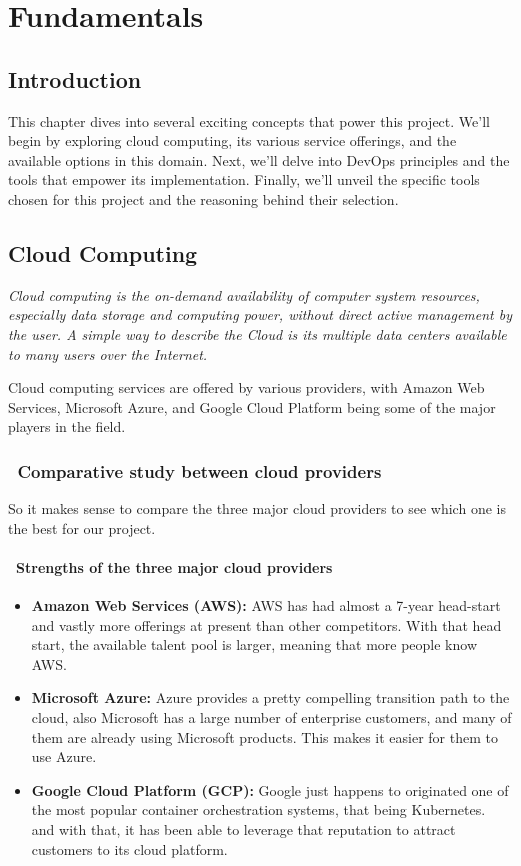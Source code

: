 \chapter{Fundamentals}
\section{Introduction}
This chapter dives into several exciting concepts that power this project. We'll begin by exploring cloud computing, its various service offerings, and the available options in this domain. Next, we'll delve into DevOps principles and the tools that empower its implementation. Finally, we'll unveil the specific tools chosen for this project and the reasoning behind their selection.

\section{Cloud Computing}
\emph{Cloud computing is the on-demand availability of computer system resources, especially data storage and computing power, without direct active management by the user. A simple way to describe the Cloud is its multiple data centers available to many users over the Internet.} \cite{BigCloud3}
\par
\noindent
Cloud computing services are offered by various providers, with Amazon Web Services, Microsoft Azure, and Google Cloud Platform being some of the major players in the field.
\subsection*{ \textbullet\ Comparative study between cloud providers}
So it makes sense to compare the three major cloud providers to see which one is the best for our project.
\subsubsection*{ \textbullet\ Strengths of the three major cloud providers \cite{BigCloud3}}
\begin{itemize}
    \item \textbf{Amazon Web Services (AWS):} AWS has had almost a 7-year head-start and vastly more offerings at present than other competitors. With that head start, the available talent pool is larger, meaning that more people know AWS.
    \item \textbf{Microsoft Azure:} Azure provides a pretty compelling transition path to the cloud, also Microsoft has a large number of enterprise customers, and many of them are already using Microsoft products. This makes it easier for them to use Azure.
    \item \textbf{Google Cloud Platform (GCP):} Google just happens to originated one of the most popular container orchestration systems, that being Kubernetes. and with that, it has been able to leverage that reputation to attract customers to its cloud platform.
\end{itemize}
